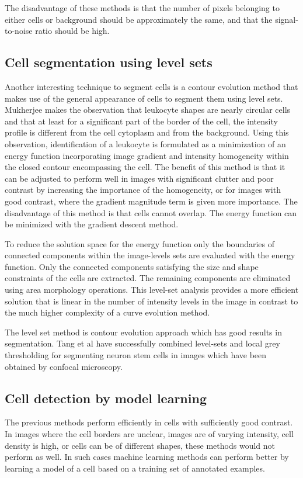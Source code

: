 The disadvantage of these methods is that the number of pixels belonging to either cells or background should be approximately the same, and that the signal-to-noise ratio should be high.

\subsection{Cell segmentation using level sets \statusfirstdraft}

Another interesting technique to segment cells is a contour evolution method that makes use of the general appearance of cells to segment them using level sets. Mukherjee \cite{mukherjee04} makes the observation that leukocyte shapes are nearly circular cells and that at least for a significant part of the border of the cell, the intensity profile is different from the cell cytoplasm and from the background. Using this observation, identification of a leukocyte is formulated as a minimization of an energy function incorporating image gradient and intensity homogeneity within the closed contour encompassing the cell. The benefit of this method is that it can be adjusted to perform well in images with significant clutter and poor contrast by increasing the importance of the homogeneity, or for images with good contrast, where the gradient magnitude term is given more importance. The disadvantage of this method is that cells cannot overlap. The energy function can be minimized with the gradient descent method.

To reduce the solution space for the energy function only the boundaries of connected components within the image-levels sets are evaluated with the energy function. Only the connected components satisfying the size and shape constraints of the cells are extracted. The remaining components are eliminated using area morphology operations. This level-set analysis provides a more efficient solution that is linear in the number of intensity levels in the image in contrast to the much higher complexity of a curve evolution method.

The level set method is contour evolution approach which has good results in segmentation. Tang et al \cite{tang} have successfully combined level-sets and local grey thresholding \cite{xu10} for segmenting neuron stem cells in images which have been obtained by confocal microscopy.

\subsection{Cell detection by model learning \statusfirstdraft}
The previous methods perform efficiently in cells with sufficiently good contrast. In images where the cell borders are unclear, images are of varying intensity, cell density is high, or cells can be of different shapes, these methods would not perform as well. In such cases machine learning methods can perform better by learning a model of a cell based on a training set of annotated examples.

